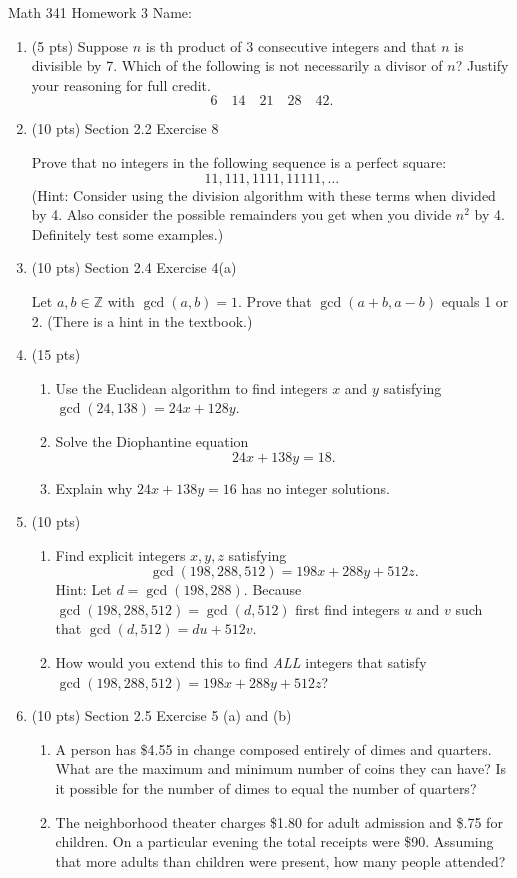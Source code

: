\documentclass[12pt]{article}
\newcommand{\Z}{\mathbb{Z}}
\begin{document}
	Math 341 Homework 3
	\hfill
	Name: \underline{\hspace*{2in}}
\begin{enumerate}
	\item (5 pts) Suppose $n$ is th product of 3 consecutive integers and that $n$ is divisible by 7.  	
		Which of the following is not necessarily a divisor of $n$? Justify your reasoning for full credit.
			\[6\quad 14\quad 21\quad 28\quad 42.\]
		\vfill
	\item(10 pts) Section 2.2 Exercise 8
	
		Prove that no integers in the following sequence is a perfect square:
		\[11, 111, 1111, 11111,\dots\]
		(Hint: Consider using the division algorithm with these terms when divided by 4. Also consider the possible remainders you get when you divide $n^2$ by 4.  Definitely test some examples.)
		\vfill
		\vfill
	\newpage
	\item (10 pts) Section 2.4 Exercise 4(a)
	
		Let $a,b\in\Z$ with $\gcd(a,b)=1$. Prove that $\gcd(a+b,a-b)$ equals 1 or 2. (There is a hint in the textbook.)
		\vfill
	\item (15 pts) 
	\begin{enumerate}
		\item Use the Euclidean algorithm to find integers $x$ and $y$ satisfying $\gcd(24,138)=24x+128y$.
		\vfill
		\newpage
		\item Solve the Diophantine equation
		\[24x+138y=18.\]
		\vfill
		\item Explain why $24x+138y=16$ has no integer solutions.
		\vfill
	\end{enumerate}
	\newpage
	\item (10 pts) 
	\begin{enumerate} 
		\item Find explicit integers $x,y,z$ satisfying 	
		\[\gcd(198,288,512)=198x+288y+512z.\]
		Hint: Let $d=\gcd(198,288)$. Because $\gcd(198,288,512)=\gcd(d,512)$ first find integers $u$ and $v$ such that $\gcd(d,512)=du+512v$.
		\vfill
		\item How would you extend this to find \textit{ALL} integers that satisfy $\gcd(198,288,512)=198x+288y+512z$?
		\vfill
	\end{enumerate}
	\newpage
	\item (10 pts) Section 2.5 Exercise 5 (a) and (b)
	\begin{enumerate}
		\item A person has \$4.55 in change composed entirely of dimes and quarters. What are the maximum and minimum number of coins they can have? Is it possible for the number of dimes to equal the number of quarters?
		\vfill
		\item The neighborhood theater charges \$1.80 for adult admission and \$.75 for children.  On a particular evening the total receipts were \$90.  Assuming that more adults than children were present, how many people attended?
		\vfill
	\end{enumerate}
\end{enumerate}
		
\end{document}

